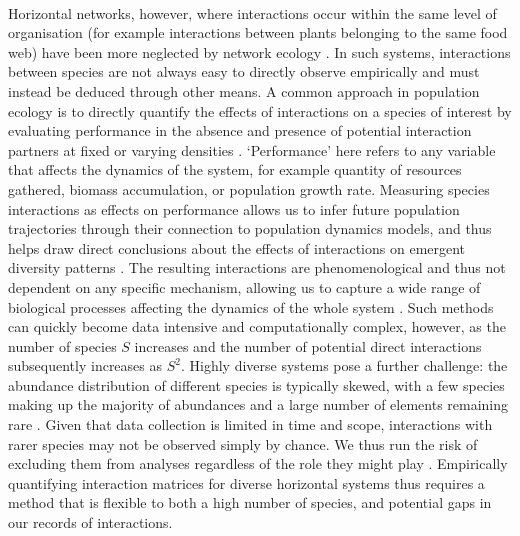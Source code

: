 \documentclass[a4,12pt]{article}
\begin{document}
\begin{refsection}
    \paragraph{} 
    Horizontal networks, however, where interactions occur within the same level of organisation (for example interactions between plants belonging to the same food web) \parencite{Vellend2016} have been more neglected by network ecology \parencite{Ellison2019}. In such systems, interactions between species are not always easy to directly observe empirically and must instead be deduced through other means. A common approach in population ecology is to directly quantify the effects of interactions on a species of interest by evaluating performance in the absence and presence of potential interaction partners at fixed or varying densities \parencite{Connell1961, Grace1990}. `Performance' here refers to any variable that affects the dynamics of the system, for example quantity of resources gathered, biomass accumulation, or population growth rate. Measuring species interactions as effects on performance allows us to infer future population trajectories through their connection to population dynamics models, and thus helps draw direct conclusions about the effects of interactions on emergent diversity patterns \parencite{Laska1998}. The resulting interactions are phenomenological and thus not dependent on any specific mechanism, allowing us to capture a wide range of biological processes affecting the dynamics of the whole system \parencite{Novak2010}. Such methods can quickly become data intensive and computationally complex, however, as the number of species $S$ increases and the number of potential direct interactions subsequently increases as $S^2$. Highly diverse systems pose a further challenge: the abundance distribution of different species is typically skewed, with a few species making up the majority of abundances and a large number of elements remaining rare \parencite{Fisher1943}. Given that data collection is limited in time and scope, interactions with rarer species may not be observed simply by chance. We thus run the risk of excluding them from analyses regardless of the role they might play \parencite{Olesen2011}. Empirically quantifying interaction matrices for diverse horizontal systems thus requires a method that is flexible to both a high number of species, and potential gaps in our records of interactions. 


\end{refsection}
\end{document}
